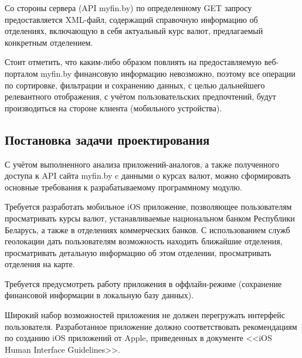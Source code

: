 Со стороны сервера (API myfin.by) по определенному GET запросу
предоставляется XML-файл, содержащий справочную информацию об отделениях,
включающую в себя актуальный курс валют, предлагаемый конкретным отделением.

Стоит отметить, что каким-либо образом повлиять на предоставляемую веб-порталом myfin.by
финансовую информацию невозможно, поэтому все операции по сортировке, фильтрации и
сохранению данных, с целью дальнейшего релевантного отображения, с учётом пользовательских
предпочтений, будут производиться на стороне клиента (мобильного устройства).



\subsection{Постановка задачи проектирования}
\label{subs:task_definition}

С учётом выполненного анализа приложений-аналогов, а также полученного доступа к
API сайта myfin.by c данными о курсах валют, можно сформировать основные
требования к разрабатываемому программному модулю.

Требуется разработать мобильное iOS приложение, позволяющее пользователям
просматривать курсы валют, устанавливаемые национальном банком Республики Беларусь,
а также в отделениях коммерческих банков. С использованием
служб геолокации дать пользователям возможность находить ближайшие отделения,
просматривать детальную информацию об этом отделении, просматривать отделения
на карте.

Требуется предусмотреть работу приложения в
оффлайн-режиме (сохранение финансовой информации в локальную базу данных).

Широкий набор возможностей приложения не должен перегружать
интерфейс пользователя.
Разработанное приложение должно соответствовать рекомендациям по созданию
iOS приложений от Apple, приведенных в документе <<iOS Human Interface Guidelines>>.
